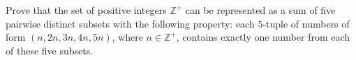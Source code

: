 Prove that the set of positive integers $\mathbb Z^+$ can be represented as a sum of five pairwise distinct subsets with the following property: each $5$-tuple of numbers of form $(n,2n,3n,4n,5n)$, where $n\in\mathbb Z^+$, contains exactly one number from each of these five subsets.